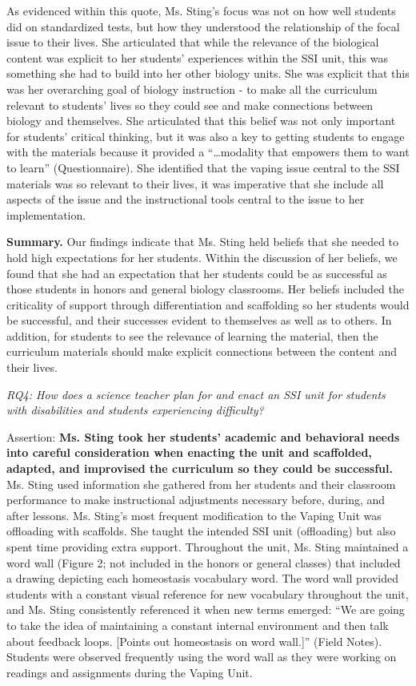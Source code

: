 \documentclass[11.5pt]{sig-alternate}
\begin{document}
\begin{large}
As evidenced within this quote, Ms. Sting’s focus was not on how well students did on standardized tests, but how they understood the relationship of the focal issue to their lives. She articulated that while the relevance of the biological content was explicit to her students' experiences within the SSI unit, this was something she had to build into her other biology units. She was explicit that this was her overarching goal of biology instruction - to make all the curriculum relevant to students’ lives so they could see and make connections between biology and themselves. She articulated that this belief was not only important for students’ critical thinking, but it was also a key to getting students to engage with the materials because it provided a “…modality that empowers them to want to learn” (Questionnaire). She identified that the vaping issue central to the SSI materials was so relevant to their lives, it was imperative that she include all aspects of the issue and the instructional tools central to the issue to her implementation.

\textbf{Summary.} Our findings indicate that Ms. Sting held beliefs that she needed to hold high expectations for her students. Within the discussion of her beliefs, we found that she had an expectation that her students could be as successful as those students in honors and general biology classrooms. Her beliefs included the criticality of support through differentiation and scaffolding so her students would be successful, and their successes evident to themselves as well as to others. In addition, for students to see the relevance of learning the material, then the curriculum materials should make explicit connections between the content and their lives.

\textit{RQ4: How does a science teacher plan for and enact an SSI unit for students with disabilities and students experiencing difficulty?}

Assertion: \textbf{Ms. Sting took her students’ academic and behavioral needs into careful consideration when enacting the unit and scaffolded, adapted, and improvised the curriculum so they could be successful.} Ms. Sting used information she gathered from her students and their classroom performance to make instructional adjustments necessary before, during, and after lessons. Ms. Sting’s most frequent modification to the Vaping Unit was offloading with scaffolds. She taught the intended SSI unit (offloading) but also spent time providing extra support. Throughout the unit, Ms. Sting maintained a word wall (Figure 2; not included in the honors or general classes) that included a drawing depicting each homeostasis vocabulary word. The word wall provided students with a constant visual reference for new vocabulary throughout the unit, and Ms. Sting consistently referenced it when new terms emerged: “We are going to take the idea of maintaining a constant internal environment and then talk about feedback loops. [Points out homeostasis on word wall.]” (Field Notes). Students were observed frequently using the word wall as they were working on readings and assignments during the Vaping Unit.


\end{large}
\end{document}
